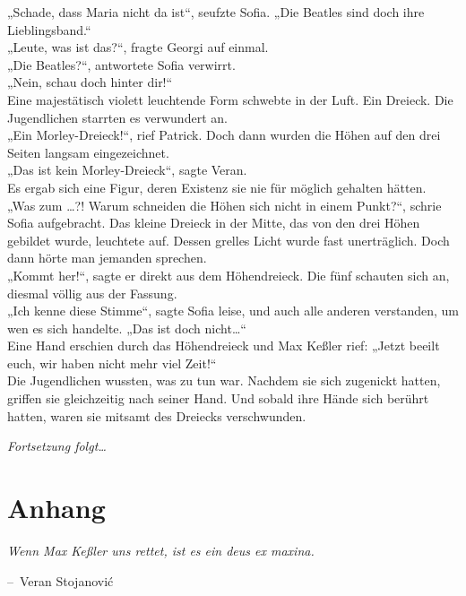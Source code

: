 \documentclass[oneside]{memoir}
\makeatletter
\newenvironment{chapquote}[2][2em]
  {\setlength{\@tempdima}{#1}%
   \def\chapquote@author{#2}%
   \parshape 1 \@tempdima \dimexpr\textwidth-2\@tempdima\relax%
   \itshape}
  {\par\normalfont\hfill--\ \chapquote@author\hspace*{\@tempdima}\par\bigskip}
\makeatother
\begin{document}
\noindent „Schade, dass Maria nicht da ist“, seufzte Sofia. „Die Beatles sind doch ihre Lieblingsband.“ \\
„Leute, was ist das?“, fragte Georgi auf einmal. \\
„Die Beatles?“, antwortete Sofia verwirrt. \\
„Nein, schau doch hinter dir!“ \\
Eine majestätisch violett leuchtende Form schwebte in der Luft. Ein Dreieck. Die Jugendlichen starrten es verwundert an. \\
„Ein Morley-Dreieck!“, rief Patrick. Doch dann wurden die Höhen auf den drei Seiten langsam eingezeichnet. \\
„Das ist kein Morley-Dreieck“, sagte Veran. \\
Es ergab sich eine Figur, deren Existenz sie nie für möglich gehalten hätten. \\
„Was zum \ldots?! Warum schneiden die Höhen sich nicht in einem Punkt?“, schrie Sofia aufgebracht. Das kleine Dreieck in der Mitte, das von den drei Höhen gebildet wurde, leuchtete auf. Dessen grelles Licht wurde fast unerträglich. Doch dann hörte man jemanden sprechen.  \\
„Kommt her!“, sagte er direkt aus dem Höhendreieck. Die fünf schauten sich an, diesmal völlig aus der Fassung. \\
„Ich kenne diese Stimme“, sagte Sofia leise, und auch alle anderen verstanden, um wen es sich handelte. „Das ist doch nicht\ldots“ \\
Eine Hand erschien durch das Höhendreieck und Max Keßler rief: „Jetzt beeilt euch, wir haben nicht mehr viel Zeit!“ \\
Die Jugendlichen wussten, was zu tun war. Nachdem sie sich zugenickt hatten, griffen sie gleichzeitig nach seiner Hand. Und sobald ihre Hände sich berührt hatten, waren sie mitsamt des Dreiecks verschwunden.

\newpage
\thispagestyle{empty}
\begin{center}
\textit{Fortsetzung folgt\ldots}
\end{center}

\chapter{Anhang}
\begin{chapquote}{Veran Stojanović}
\glqq Wenn Max Keßler uns rettet, ist es ein deus ex maxina.\grqq
\end{chapquote}
\end{document}
